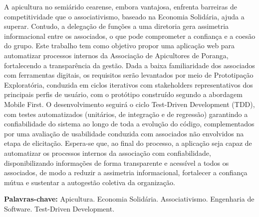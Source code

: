 A apicultura no semiárido cearense, embora vantajosa, enfrenta barreiras de competitividade que o associativismo, baseado na Economia Solidária, ajuda a superar. Contudo, a delegação de funções a uma diretoria gera assimetria informacional entre os associados, o que pode comprometer a confiança e a coesão do grupo. Este trabalho tem como objetivo propor uma aplicação web para automatizar processos internos da Associação de Apicultores de Poranga, fortalecendo a transparência da gestão. Dada a baixa familiaridade dos associados com ferramentas digitais, os requisitos serão levantados por meio de Prototipação Exploratória, conduzida em ciclos iterativos com stakeholders representativos dos principais perfis de usuário, com o protótipo construído segundo a abordagem Mobile First. O desenvolvimento seguirá o ciclo Test-Driven Development (TDD), com testes automatizados (unitários, de integração e de regressão) garantindo a confiabilidade do sistema ao longo de toda a evolução do código, complementados por uma avaliação de usabilidade conduzida com associados não envolvidos na etapa de elicitação. Espera-se que, ao final do processo, a aplicação seja capaz de automatizar os processos internos da associação com confiabilidade, disponibilizando informações de forma transparente e acessível a todos os associados, de modo a reduzir a assimetria informacional, fortalecer a confiança mútua e sustentar a autogestão coletiva da organização.
 
\textbf{Palavras-chave:} Apicultura. Economia Solidária. Associativismo. Engenharia de Software. Test-Driven Development.